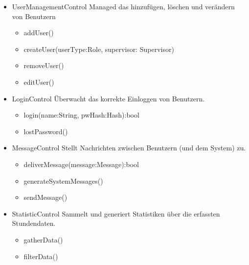 \begin{itemize}
\begin{itemize}
                    \item{UserManagementControl}
                        Managed das hinzufügen, löschen und verändern von Benutzern
                        \begin{itemize}
                             \item{addUser()}
                             \item{createUser(userType:Role, supervisor: Supervisor)}
                             \item{removeUser()}
                             \item{editUser()}
                        \end{itemize}

                    \item{LoginControl}
                        Überwacht das korrekte Einloggen von Benutzern.
                        \begin{itemize}
                             \item{login(name:String, pwHash:Hash):bool}
                             \item{lostPassword()}
                        \end{itemize}

                    \item{MessageControl}
                        Stellt Nachrichten zwischen Benutzern (und dem System) zu.
                        \begin{itemize}
                             \item{deliverMessage(message:Message):bool}
                             \item{generateSystemMessages()}
                             \item{sendMessage()}
                        \end{itemize}

                    \item{StatisticControl}
                        Sammelt und generiert Statistiken über die erfassten Stundendaten.
                        \begin{itemize}
                             \item{gatherData()}
                             \item{filterData()}
                        \end{itemize}


\end{itemize}
\end{itemize}

